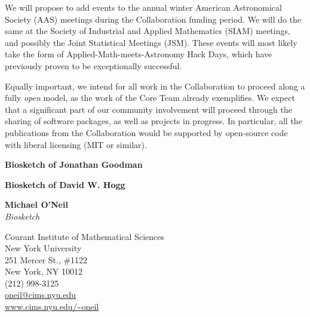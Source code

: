 \documentclass[12pt]{article}
\begin{document}

We will propose to add events to the annual winter American Astronomical
Society (AAS) meetings during the Collaboration funding period.
We will do the same at the Society of Industrial and Applied Mathematics
(SIAM) meetings, and possibly the Joint Statistical Meetings (JSM).
These events will most likely take the form of
Applied-Math-meets-Astronomy Hack Days, which have previously proven to
be exceptionally successful.

Equally important, we intend for all work in the Collaboration to
proceed along a fully {\em open} model, as the work of the Core Team
already exemplifies.
We expect that a significant part of our community involvement will
proceed through the sharing of software packages, as well as projects in
progress.
In particular, all the publications from the Collaboration would be
supported by open-source code with liberal licensing (MIT or similar).

\newpage
\begin{center}
    {\bf \large Biosketch of Jonathan Goodman}
\end{center}

\newpage
\begin{center}
    {\bf \large Biosketch of David W. Hogg}
\end{center}

\newpage
\begin{center}
    {\bf \large Michael O'Neil}\\
    {\em Biosketch}
\end{center}

\bigskip

\noindent
Courant Institute of Mathematical Sciences\\
New York University\\
251 Mercer St., \#1122\\
New York, NY 10012\\
(212) 998-3125\\
\url{oneil@cims.nyu.edu}\\
\url{www.cims.nyu.edu/~oneil}\\

\bigskip
\end{document}

